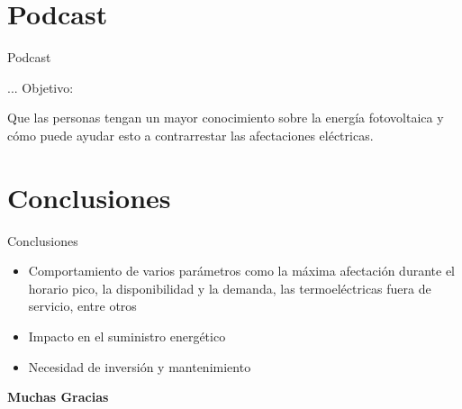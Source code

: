 \documentclass{beamer}
\begin{document}
\section{Podcast}
\begin{frame}{Podcast}
     \begin{block}{...}
            Objetivo:
        \end{block}
    Que las personas tengan un mayor conocimiento sobre la energía fotovoltaica y cómo puede ayudar esto a contrarrestar las afectaciones eléctricas.
\end{frame}

\section{Conclusiones}
\begin{frame}{Conclusiones}
    \centering
    \begin{itemize}
        \item Comportamiento de varios parámetros como la máxima afectación durante el horario pico, la disponibilidad y la demanda, las termoeléctricas fuera de servicio, entre otros
        \item Impacto en el suministro energético
        \item Necesidad de inversión y mantenimiento
        \end{itemize}
    \vspace{3cm}
 \textbf{Muchas Gracias}
\end{frame}
\end{document}
